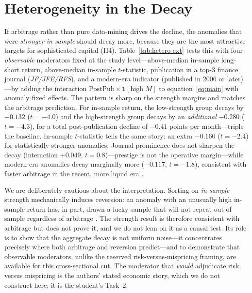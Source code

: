 \documentclass[12pt]{article}
\begin{document}
\section{Heterogeneity in the Decay}\label{sec:het}
If arbitrage rather than pure data-mining drives the decline, the anomalies that were
\emph{stronger in sample} should decay more, because they are the most attractive targets for
sophisticated capital (H4). Table~\ref{tab:hetero-ext} tests this with four \emph{observable}
moderators fixed at the study level---above-median in-sample long-short return, above-median
in-sample $t$-statistic, publication in a top-3 finance journal (\emph{JF/JFE/RFS}), and a
modern-era indicator (published in 2006 or later)---by adding the interaction
$\text{PostPub}\times\mathbf{1}[\text{high }M]$ to equation~\eqref{eq:main} with anomaly fixed
effects. The pattern is sharp on the strength margins and matches the arbitrage prediction. For
in-sample return, the low-strength group decays by $-0.132$ ($t=-4.0$) and the high-strength
group decays by an \emph{additional} $-0.280$ ($t=-4.3$), for a total post-publication decline
of $-0.41$ points per month---triple the baseline. In-sample $t$-statistic tells the same
story: an extra $-0.160$ ($t=-2.4$) for statistically stronger anomalies. Journal prominence
does not sharpen the decay (interaction $+0.049$, $t=0.8$)---prestige is not the operative
margin---while modern-era anomalies decay marginally more ($-0.117$, $t=-1.8$), consistent with
faster arbitrage in the recent, more liquid era \citep{chordia2014}.

We are deliberately cautious about the interpretation. Sorting on \emph{in-sample} strength
mechanically induces reversion: an anomaly with an unusually high in-sample return has, in part,
drawn a lucky sample that will not repeat out of sample regardless of arbitrage
\citep{harveyliuzhu2016,mcleanpontiff2016}. The strength result is therefore consistent with
arbitrage but does not prove it, and we do not lean on it as a causal test. Its role is to show
that the aggregate decay is not uniform noise---it concentrates precisely where both arbitrage
and reversion predict---and to demonstrate that observable moderators, unlike the reserved
risk-versus-mispricing framing, are available for this cross-sectional cut. The moderator that
\emph{would} adjudicate risk versus mispricing is the authors' stated economic story, which we
do not construct here; it is the student's Task~2.
\end{document}
